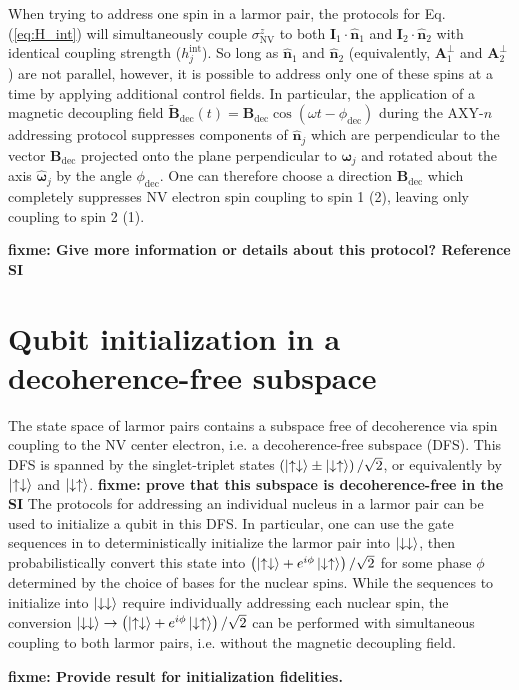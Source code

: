 \documentclass[twocolumn]{revtex4-1}
\renewcommand{\t}{\text} %
\newcommand{\p}[1]{\left(#1\right)} %
\renewcommand{\v}{\bm} %
\newcommand{\uv}[1]{\hat{\v{#1}}} %
\renewcommand{\c}{\cdot} %
\renewcommand{\u}{\uparrow}
\renewcommand{\d}{\downarrow}
\newcommand{\NV}{\t{NV}}
\newcommand{\fixme}[1]{{\bf \color{red} fixme: #1}}
\begin{document}
When trying to address one spin in a larmor pair, the protocols for
Eq. (\ref{eq:H_int}) will simultaneously couple $\sigma_\NV^z$ to both
$\v I_1\c\uv n_1$ and $\v I_2\c\uv n_2$ with identical coupling
strength ($h_j^{\t{int}}$). So long as $\uv n_1$ and $\uv n_2$
(equivalently, $\v A_1^\perp$ and $\v A_2^\perp$) are not parallel,
however, it is possible to address only one of these spins at a time
by applying additional control fields. In particular, the application
of a magnetic decoupling field
$\tilde{\v B}_{\t{dec}}\p{t}=\v B_{\t{dec}}\cos\p{\omega
  t-\phi_{\t{dec}}}$ during the AXY-$n$ addressing protocol suppresses
components of $\uv n_j$ which are perpendicular to the vector
$\v B_{\t{dec}}$ projected onto the plane perpendicular to
$\v\omega_j$ and rotated about the axis $\uv\omega_j$ by the angle
$\phi_{\t{dec}}$. One can therefore choose a direction
$\v B_{\t{dec}}$ which completely suppresses NV electron spin coupling
to spin 1 (2), leaving only coupling to spin 2 (1).

\fixme{Give more information or details about this protocol? Reference
  SI}

\section{Qubit initialization in a decoherence-free subspace}

The state space of larmor pairs contains a subspace free of
decoherence via spin coupling to the NV center electron, i.e. a
decoherence-free subspace (DFS). This DFS is spanned by the
singlet-triplet states $\p{\ket{\u\d}\pm\ket{\d\u}}/\sqrt2$, or
equivalently by $\ket{\u\d}$ and $\ket{\d\u}$. \fixme{prove that this
  subspace is decoherence-free in the SI} The protocols for addressing
an individual nucleus in a larmor pair can be used to initialize a
qubit in this DFS. In particular, one can use the gate sequences in
\cite{reiserer2016robust} to deterministically initialize the larmor
pair into $\ket{\d\d}$, then probabilistically convert this state into
$\p{\ket{\u\d}+e^{i\phi}\ket{\d\u}}/\sqrt2$ for some phase $\phi$
determined by the choice of bases for the nuclear spins. While the
sequences to initialize into $\ket{\d\d}$ require individually
addressing each nuclear spin, the conversion
$\ket{\d\d}\to\p{\ket{\u\d}+e^{i\phi}\ket{\d\u}}/\sqrt2$ can be
performed with simultaneous coupling to both larmor pairs,
i.e. without the magnetic decoupling field.

\fixme{Provide result for initialization fidelities.}
\end{document}
